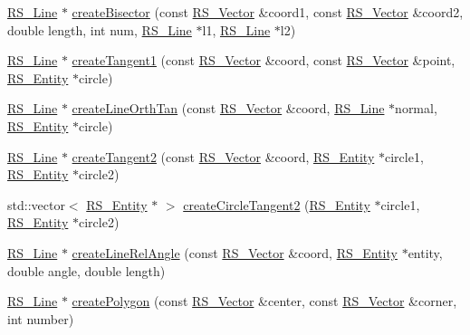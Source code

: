 \begin{DoxyCompactItemize}
\item 
\hyperlink{classRS__Line}{R\-S\-\_\-\-Line} $\ast$ \hyperlink{classRS__Creation_aa1e2420d40b0f5c9869218e717180182}{create\-Bisector} (const \hyperlink{classRS__Vector}{R\-S\-\_\-\-Vector} \&coord1, const \hyperlink{classRS__Vector}{R\-S\-\_\-\-Vector} \&coord2, double length, int num, \hyperlink{classRS__Line}{R\-S\-\_\-\-Line} $\ast$l1, \hyperlink{classRS__Line}{R\-S\-\_\-\-Line} $\ast$l2)
\item 
\hyperlink{classRS__Line}{R\-S\-\_\-\-Line} $\ast$ \hyperlink{classRS__Creation_ad1caf86974150541cf1d5f22d9e4eb2a}{create\-Tangent1} (const \hyperlink{classRS__Vector}{R\-S\-\_\-\-Vector} \&coord, const \hyperlink{classRS__Vector}{R\-S\-\_\-\-Vector} \&point, \hyperlink{classRS__Entity}{R\-S\-\_\-\-Entity} $\ast$circle)
\item 
\hyperlink{classRS__Line}{R\-S\-\_\-\-Line} $\ast$ \hyperlink{classRS__Creation_af1e854c02754a1e8df88947e035de315}{create\-Line\-Orth\-Tan} (const \hyperlink{classRS__Vector}{R\-S\-\_\-\-Vector} \&coord, \hyperlink{classRS__Line}{R\-S\-\_\-\-Line} $\ast$normal, \hyperlink{classRS__Entity}{R\-S\-\_\-\-Entity} $\ast$circle)
\item 
\hyperlink{classRS__Line}{R\-S\-\_\-\-Line} $\ast$ \hyperlink{classRS__Creation_ac33d0f0c5ecfe42de57be2785029314a}{create\-Tangent2} (const \hyperlink{classRS__Vector}{R\-S\-\_\-\-Vector} \&coord, \hyperlink{classRS__Entity}{R\-S\-\_\-\-Entity} $\ast$circle1, \hyperlink{classRS__Entity}{R\-S\-\_\-\-Entity} $\ast$circle2)
\item 
std\-::vector$<$ \hyperlink{classRS__Entity}{R\-S\-\_\-\-Entity} $\ast$ $>$ \hyperlink{classRS__Creation_aad1c80369fdc22d2411031aa8599c0f2}{create\-Circle\-Tangent2} (\hyperlink{classRS__Entity}{R\-S\-\_\-\-Entity} $\ast$circle1, \hyperlink{classRS__Entity}{R\-S\-\_\-\-Entity} $\ast$circle2)
\item 
\hyperlink{classRS__Line}{R\-S\-\_\-\-Line} $\ast$ \hyperlink{classRS__Creation_ab31f1134d2c036510ef34f39921a8f8d}{create\-Line\-Rel\-Angle} (const \hyperlink{classRS__Vector}{R\-S\-\_\-\-Vector} \&coord, \hyperlink{classRS__Entity}{R\-S\-\_\-\-Entity} $\ast$entity, double angle, double length)
\item 
\hyperlink{classRS__Line}{R\-S\-\_\-\-Line} $\ast$ \hyperlink{classRS__Creation_a873a44aa2e3ef6ad7cb1ded40125f506}{create\-Polygon} (const \hyperlink{classRS__Vector}{R\-S\-\_\-\-Vector} \&center, const \hyperlink{classRS__Vector}{R\-S\-\_\-\-Vector} \&corner, int number)
\item 

\end{DoxyCompactItemize}
